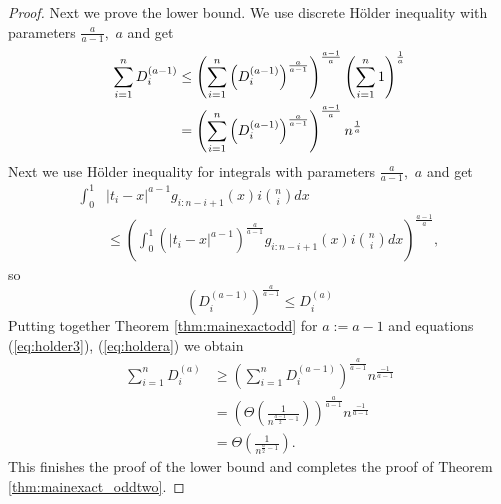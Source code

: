 \documentclass[final,5p,times,twocolumn]{elsarticle_mod}
\begin{document}
\begin{proof}
Next we prove the lower bound.
We use discrete H\"older inequality with parameters $\frac{a }{a-1},$  ${a}$
and get
\begin{align}
\sum_{i=1}^{n}D^{(a-1)}_i
&\le \notag
\left(\sum_{i=1}^{n}\left(D^{(a-1)}_i\right)^{\frac{a}{a-1}}\right)^{\frac{a-1}{a}}
\left(\sum_{i=1}^{n}1\right)^{\frac{1}{a}}\\
&=  \label{eq:holder3}
\left(\sum_{i=1}^{n}\left(D^{(a-1)}_i\right)^{\frac{a}{a-1}}\right)^{\frac{a-1}{a}}
n^{\frac{1}{a}}
\end{align}
Next we use H\"older inequality for integrals with parameters $\frac{a}{a-1},$ ${a}$ and get
\begin{align*}
\int_0^1&|t_i-x|^{a-1}g_{i:n-i+1}(x)i\binom{n}{i}dx\\
&\le
\left(\int_0^1\left(|t_i-x|^{a-1}\right)^{\frac{a}{a-1}}g_{i:n-i+1}(x)i\binom{n}{i}dx\right)^{\frac{a-1}{a}},
\end{align*}
so 
\begin{equation}
\label{eq:holdera}
\left(D^{(a-1)}_i\right)^{\frac{a}{a-1}}\le D^{(a)}_i
\end{equation}
Putting together Theorem \ref{thm:mainexactodd} for $a:=a-1$ and equations (\ref{eq:holder3}), (\ref{eq:holdera}) we obtain
\begin{align*}
\sum_{i=1}^{n}D^{(a)}_i&\ge \left(\sum_{i=1}^{n}D_{i}^{(a-1)}\right)^{\frac{a}{a-1}}
n^{\frac{-1}{a-1}}\\
&=\left(\Theta\left(\frac{1}{n^{\frac{a-1}{2}-1}}\right)\right)^{\frac{a}{a-1}}
n^{\frac{-1}{a-1}}\\
&=
\Theta\left(\frac{1}{n^{\frac{a }{2}-1}}\right).
\end{align*}
This finishes the proof of the lower bound and completes the proof of Theorem \ref{thm:mainexact_oddtwo}. 
\end{proof}
\end{document}
